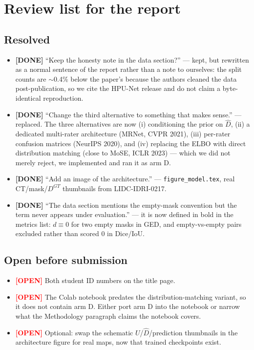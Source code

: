\documentclass[11pt]{article}
\newcommand{\done}[1]{\textcolor{green!50!black}{\textbf{[DONE]}} #1}
\newcommand{\open}[1]{\textcolor{red}{\textbf{[OPEN]}} #1}
\begin{document}
\section*{Review list for the report}

\subsection*{Resolved}
\begin{itemize}
  \item \done{``Keep the honesty note in the data section?'' --- kept, but
        rewritten as a normal sentence of the report rather than a note to
        ourselves: the split counts are $\sim$0.4\% below the paper's because the
        authors cleaned the data post-publication, so we cite the HPU-Net release
        and do not claim a byte-identical reproduction.}
  \item \done{``Change the third alternative to something that makes sense.'' ---
        replaced. The three alternatives are now (i) conditioning the prior on
        $\hat D$, (ii) a dedicated multi-rater architecture (MRNet, CVPR 2021),
        (iii) per-rater confusion matrices (NeurIPS 2020), and (iv) replacing the
        ELBO with direct distribution matching (close to MoSE, ICLR 2023) --- which
        we did not merely reject, we implemented and ran it as arm D.}
  \item \done{``Add an image of the architecture.'' --- \texttt{figure\_model.tex},
        real CT/mask/$D^{GT}$ thumbnails from LIDC-IDRI-0217.}
  \item \done{``The data section mentions the empty-mask convention but the term
        never appears under evaluation.'' --- it is now defined in bold in the
        metrics list: $d\equiv0$ for two empty masks in GED, and empty-vs-empty
        pairs excluded rather than scored 0 in Dice/IoU.}
\end{itemize}

\subsection*{Open before submission}
\begin{itemize}
  \item \open{Both student ID numbers on the title page.}
  \item \open{The Colab notebook predates the distribution-matching variant, so it
        does not contain arm D. Either port arm D into the notebook or narrow what
        the Methodology paragraph claims the notebook covers.}
  \item \open{Optional: swap the schematic $U$/$\hat D$/prediction thumbnails in
        the architecture figure for real maps, now that trained checkpoints exist.}
\end{itemize}
\end{document}
